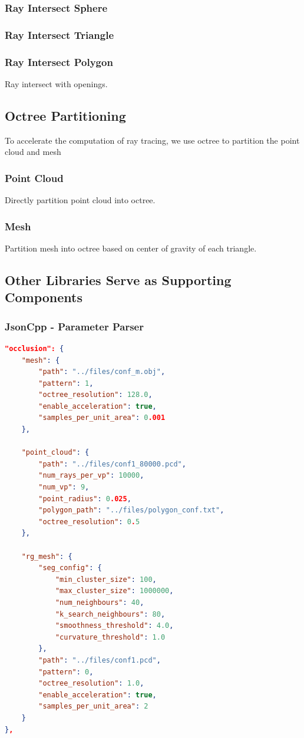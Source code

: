 \documentclass[11pt, a4paper,oneside,chapterprefix=false]{scrbook}
\begin{document}
\subsubsection{Ray Intersect Sphere}

\subsubsection{Ray Intersect Triangle}

\subsubsection{Ray Intersect Polygon}

Ray intersect with openings.

\subsection{Octree Partitioning}

To accelerate the computation of ray tracing, we use octree to partition the point cloud and mesh

\subsubsection{Point Cloud}

Directly partition point cloud into octree.

\subsubsection{Mesh}

Partition mesh into octree based on center of gravity of each triangle.

\subsection{Other Libraries Serve as Supporting Components} \label{sec:supporting libraries}

\subsubsection{JsonCpp - Parameter Parser} \label{subsec:jsoncpp}

\begin{lstlisting}[language=json, caption=Json Configuration File]
"occlusion": {
	"mesh": {
		"path": "../files/conf_m.obj",
		"pattern": 1,
		"octree_resolution": 128.0,
		"enable_acceleration": true,
		"samples_per_unit_area": 0.001
	},

	"point_cloud": {
		"path": "../files/conf1_80000.pcd",
		"num_rays_per_vp": 10000, 
		"num_vp": 9, 
		"point_radius": 0.025,
		"polygon_path": "../files/polygon_conf.txt",
		"octree_resolution": 0.5
	},

	"rg_mesh": {
		"seg_config": {
			"min_cluster_size": 100,
			"max_cluster_size": 1000000,
			"num_neighbours": 40,
			"k_search_neighbours": 80,
			"smoothness_threshold": 4.0,
			"curvature_threshold": 1.0
		},
		"path": "../files/conf1.pcd",
		"pattern": 0,
		"octree_resolution": 1.0,
		"enable_acceleration": true,
		"samples_per_unit_area": 2
	}
},
\end{lstlisting}
\end{document}
